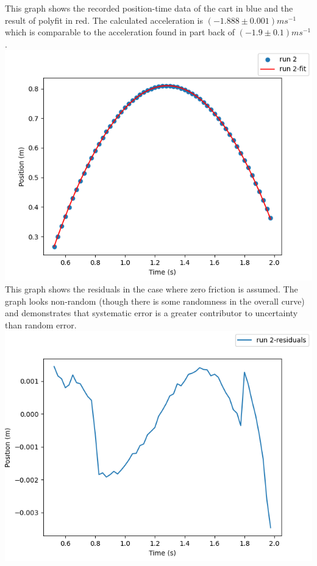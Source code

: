 \documentclass[10pt]{article}
\theoremstyle{definition}
\begin{document}
\inputminted{python}{lab1c.py}
\newpage
This graph shows the recorded position-time data of the cart in blue and the result of polyfit in red.
The calculated acceleration is $\left(-1.888\pm0.001\right)ms^{-1}$ which is comparable to the acceleration found in part back
of $\left(-1.9\pm0.1\right)ms^{-1}$.
\\
\includegraphics{Figure_1.png} \\ \newpage
This graph shows the residuals in the case where zero friction is assumed. The graph looks
non-random (though there is some randomness in the overall curve) and demonstrates that systematic error is a greater contributor to uncertainty than
random error.\\
\includegraphics{Figure_2.png} \\ \newpage
\end{document}
